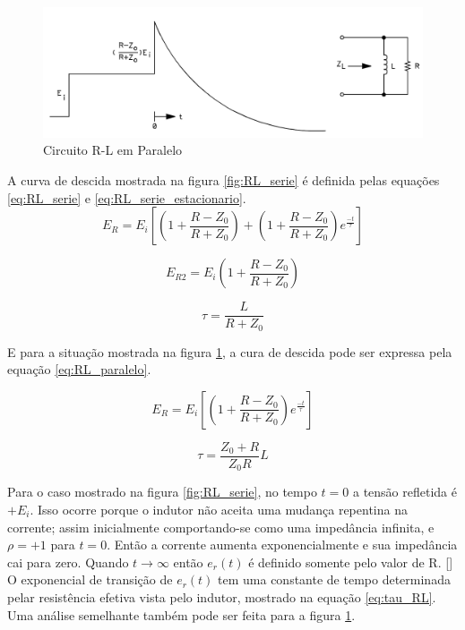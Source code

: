\begin{figure}[htb!]
	\begin{center}
		\includegraphics[scale=.30]{./cap2/figuras/R-L_parallel_response.png}
		\caption{Circuito R-L em Paralelo}
		\label{fig:RL_paralelo}
	\end{center}
\end{figure}

A curva de descida mostrada na figura \ref{fig:RL_serie} é definida pelas equações \ref{eq:RL_serie} e \ref{eq:RL_serie_estacionario}.
%
\begin{equation}
\label{eq:RL_serie}
E_R = E_i \left[\left( 1 + \frac{R - Z_0}{R + Z_0}\right) + \left( 1 + \frac{R - Z_0}{R + Z_0}\right) e^{\frac{-t}{\tau}}\right]
\end{equation}

\begin{equation}
\label{eq:RL_serie_estacionario}
E_{R2} =  E_i \left( 1 + \frac{R - Z_0}{R + Z_0}\right) 
\end{equation}

\begin{equation}
\label{eq:tau_RL}
\tau = \frac{L}{R + Z_0}
\end{equation}

E para a situação mostrada na figura \ref{fig:RL_paralelo}, a cura de descida pode ser expressa pela equação \ref{eq:RL_paralelo}.

\begin{equation}
\label{eq:RL_paralelo}
E_R = E_i\left[\left( 1 + \frac{R-Z_0}{R+Z_0}\right)e^{\frac{-t}{\tau}}\right]
\end{equation}


\begin{equation}
\tau = \frac{Z_0+R}{Z_0R}L
\end{equation}

Para o caso mostrado na figura \ref{fig:RL_serie}, no tempo $t = 0$ a tensão refletida é $+E_i$. Isso ocorre porque o indutor não aceita uma mudança repentina na corrente; assim inicialmente comportando-se como uma impedância infinita, e $\rho = +1$ para $t = 0$. Então a corrente aumenta exponencialmente e sua impedância cai para zero. Quando $t \rightarrow \infty$ então $e_r(t)$ é definido somente pelo valor de R. [\cite{agilent}]
O exponencial de transição de $e_r(t)$ tem uma constante de tempo determinada pelar resistência efetiva vista pelo indutor, mostrado na equação \ref{eq:tau_RL}. Uma análise semelhante também pode ser feita para a figura \ref{fig:RL_paralelo}.


